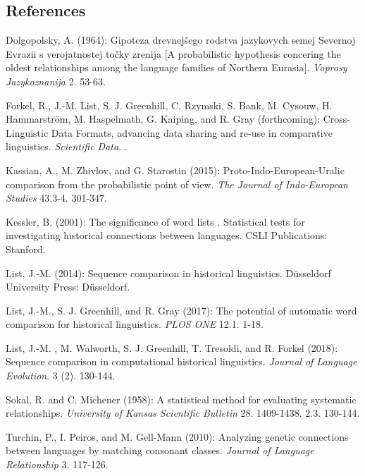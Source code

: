 \documentclass[
  a4paper,
  14pt,
  oneside,
  tablecaptionabove
]{scrbook}
\begin{document}
\subsection*{References}

\nopagebreak\hangindent=0.7cm {\small Dolgopolsky, A. (1964): {Gipoteza drevnejšego rodstva
jazykovych semej Severnoj Evrazii s verojatnostej točky zrenija} {[}A
probabilistic hypothesis concering the oldest relationships among the
language families of Northern Eurasia{]}. \emph{Voprosy Jazykoznanija}
2. 53-63.}

\nopagebreak\hangindent=0.7cm {\small Forkel, R., J.-M. List, S. J. Greenhill, C. Rzymski, S. Bank, M. Cysouw,
H. Hammarström, M. Haspelmath, G. Kaiping, and R. Gray (forthcoming):
{Cross-Linguistic Data Formats, advancing data sharing and re-use
in comparative linguistics}.  \emph{Scientific Data}. . }

\nopagebreak\hangindent=0.7cm {\small Kassian, A., M. Zhivlov, and G. Starostin (2015):
{Proto-Indo-European-Uralic comparison from the probabilistic
point of view}.  \emph{The Journal of Indo-European Studies} 43.3-4.
301-347. }

\nopagebreak\hangindent=0.7cm {\small Kessler, B. (2001): {The significance of word lists} {.
Statistical tests for investigating historical connections between
languages}.  CSLI Publications: Stanford. }

\nopagebreak\hangindent=0.7cm {\small List, J.-M. (2014): {Sequence comparison in historical
linguistics}.  Düsseldorf University Press: Düsseldorf. }

\nopagebreak\hangindent=0.7cm {\small List, J.-M., S. J. Greenhill, and R. Gray (2017): {The potential
of automatic word comparison for historical linguistics}.  \emph{PLOS
ONE} 12.1. 1-18. }

\nopagebreak\hangindent=0.7cm {\small List, J.-M. , M. Walworth, S. J. Greenhill, T. Tresoldi, and R.
Forkel (2018): {Sequence comparison in computational historical
linguistics}.  \emph{Journal of Language Evolution}. 3 (2). 130-144.\\ }

\nopagebreak\hangindent=0.7cm {\small Sokal, R. and C. Michener (1958): {A statistical method for
evaluating systematic relationships}.  \emph{University of Kansas
Scientific Bulletin} 28. 1409-1438. 2.3. 130-144.\\ }

\nopagebreak\hangindent=0.7cm {\small Turchin, P., I. Peiros, and M. Gell-Mann (2010): {Analyzing
genetic connections between languages by matching consonant classes}. 
\emph{Journal of Language Relationship} 3. 117-126. }
\end{document}
